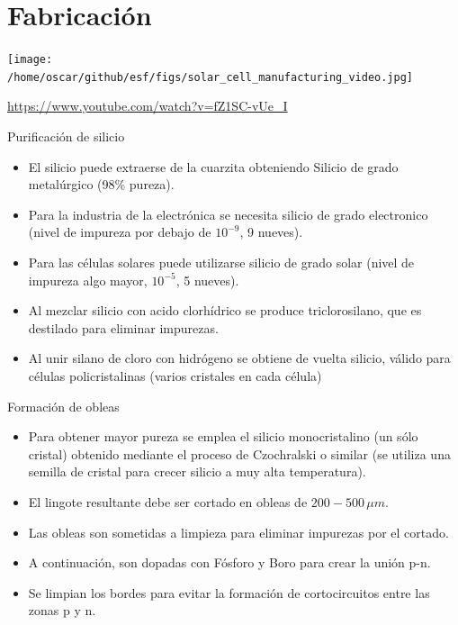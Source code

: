 \documentclass[xcolor={usenames,svgnames,dvipsnames}]{beamer}
\begin{document}
\section{Fabricación}
\label{sec:org047b983}

\begin{frame}[label={sec:org429ff2d}]{}
\begin{center}
\texttt{[image: /home/oscar/github/esf/figs/solar\_cell\_manufacturing\_video.jpg]}
\end{center}

\url{https://www.youtube.com/watch?v=fZ1SC-vUe_I}
\end{frame}

\begin{frame}[label={sec:org142d8a6}]{Purificación de silicio}
\begin{itemize}
\item El silicio puede extraerse de la cuarzita obteniendo Silicio de grado metalúrgico (98\% pureza).

\item Para la industria de la electrónica se necesita silicio de grado electronico (nivel de impureza por debajo de \(10^{-9}\), 9 nueves).

\item Para las células solares puede utilizarse silicio de grado solar (nivel de impureza algo mayor, \(10^{-5}\), 5 nueves).

\item Al mezclar silicio con acido clorhídrico se produce triclorosilano, que es destilado para eliminar impurezas.

\item Al unir silano de cloro con hidrógeno se obtiene de vuelta silicio, válido para células policristalinas (varios cristales en cada célula)
\end{itemize}
\end{frame}

\begin{frame}[label={sec:orge9173cf}]{Formación de obleas}
\begin{itemize}
\item Para obtener mayor pureza se emplea el silicio monocristalino (un sólo cristal) obtenido mediante el proceso de Czochralski o similar (se utiliza una semilla de cristal para crecer silicio a muy alta temperatura).

\item El lingote resultante debe ser cortado en obleas de \(200-500\,\mu m\).

\item Las obleas son sometidas a limpieza para eliminar impurezas por el cortado.

\item A continuación, son dopadas con Fósforo y Boro para crear la unión p-n.

\item Se limpian los bordes para evitar la formación de cortocircuitos entre las zonas p y n.
\end{itemize}
\end{frame}
\end{document}
